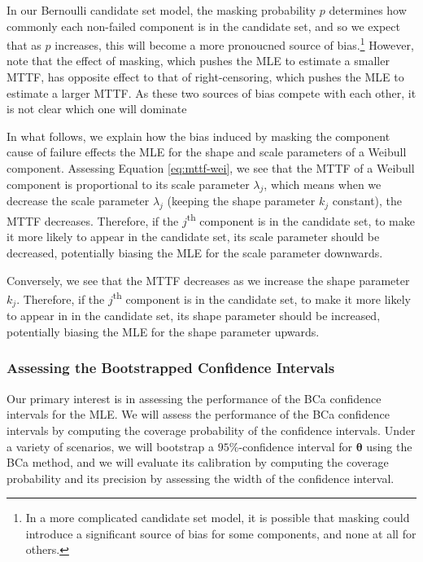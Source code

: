 \documentclass[
]{article}
\begin{document}
In our Bernoulli candidate set model, the masking probability \(p\)
determines how commonly each non-failed component is in the candidate
set, and so we expect that as \(p\) increases, this will become a more
pronoucned source of
bias.\footnote{In a more complicated candidate set model, it is possible
that masking could introduce a significant source of bias for some components, and none at all
for others.} However, note that the effect of masking, which pushes the
MLE to estimate a smaller MTTF, has opposite effect to that of
right-censoring, which pushes the MLE to estimate a larger MTTF. As
these two sources of bias compete with each other, it is not clear which
one will dominate

In what follows, we explain how the bias induced by masking the
component cause of failure effects the MLE for the shape and scale
parameters of a Weibull component. Assessing Equation
\eqref{eq:mttf-wei}, we see that the MTTF of a Weibull component is
proportional to its scale parameter \(\lambda_j\), which means when we
decrease the scale parameter \(\lambda_j\) (keeping the shape parameter
\(k_j\) constant), the MTTF decreases. Therefore, if the
\(j\)\textsuperscript{th} component is in the candidate set, to make it
more likely to appear in the candidate set, its scale parameter should
be decreased, potentially biasing the MLE for the scale parameter
downwards.

Conversely, we see that the MTTF decreases as we increase the shape
parameter \(k_j\). Therefore, if the \(j\)\textsuperscript{th} component
is in the candidate set, to make it more likely to appear in in the
candidate set, its shape parameter should be increased, potentially
biasing the MLE for the shape parameter upwards.

\hypertarget{assessing-the-bootstrapped-confidence-intervals}{%
\subsubsection{Assessing the Bootstrapped Confidence
Intervals}\label{assessing-the-bootstrapped-confidence-intervals}}

Our primary interest is in assessing the performance of the BCa
confidence intervals for the MLE. We will assess the performance of the
BCa confidence intervals by computing the coverage probability of the
confidence intervals. Under a variety of scenarios, we will bootstrap a
\(95\%\)-confidence interval for \(\boldsymbol{\theta}\) using the BCa
method, and we will evaluate its calibration by computing the coverage
probability and its precision by assessing the width of the confidence
interval.
\end{document}
